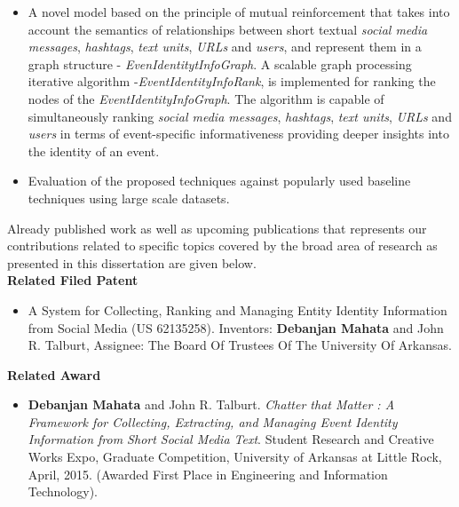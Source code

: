 \begin{itemize}
\item A novel model based on the principle of mutual reinforcement that takes into account the semantics of relationships between short textual \textit{social media messages}, \textit{hashtags}, \textit{text units}, \textit{URLs} and \textit{users}, and represent them in a graph structure - \textit{EvenIdentitytInfoGraph}. A scalable graph processing iterative algorithm -\textit{EventIdentityInfoRank}, is implemented for ranking the nodes of the \textit{EventIdentityInfoGraph}. The algorithm is capable of simultaneously ranking \textit{social media messages}, \textit{hashtags}, \textit{text units}, \textit{URLs} and \textit{users} in terms of event-specific informativeness providing deeper insights into the identity of an event.

\item Evaluation of the proposed techniques against popularly used baseline techniques using large scale datasets.

\end{itemize}

Already published work as well as upcoming publications that represents our contributions related to specific topics covered by the broad area of research as presented in this dissertation are given below. \\ 

\textbf{\LARGE Related Filed Patent}
\begin{itemize}
\item A System for Collecting, Ranking and Managing Entity Identity Information from Social Media (US 62135258). Inventors: \textbf{Debanjan Mahata} and John R. Talburt, Assignee: The Board Of Trustees Of The University Of Arkansas.
\end{itemize}

\textbf{\LARGE Related Award}
\begin{itemize}
\item \textbf{Debanjan Mahata} and John R. Talburt. \textit{Chatter that Matter : A Framework for Collecting, Extracting, and Managing Event Identity Information from Short Social Media Text}. Student Research and Creative Works Expo, Graduate Competition, University of Arkansas at Little Rock, April, 2015. (Awarded First Place in Engineering and Information Technology).  
\end{itemize}

